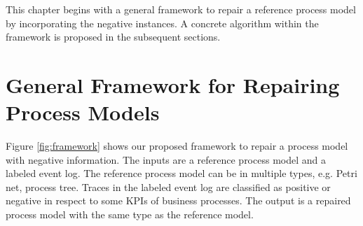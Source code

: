 

This chapter begins with a general framework to repair a reference process model by incorporating the negative instances. A concrete algorithm within the framework is proposed in the subsequent sections. 
\section{General Framework for Repairing Process Models}
Figure \ref{fig:framework} shows our proposed framework to repair a process model with negative information. The inputs are a reference process model and a labeled event log. The reference process model can be in multiple types, e.g. Petri net, process tree. Traces in the labeled event log are classified as positive or negative in respect to some KPIs of business processes. The output is a repaired process model with the same type as the reference model.

